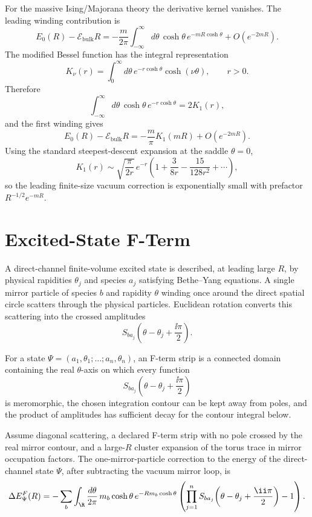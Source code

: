 \begin{example}
\label{ex:free-majorana-leading-winding}
For the massive Ising/Majorana theory the derivative kernel vanishes.  The
leading winding contribution is
\[
  E_0(R)-\mathcal E_{\mathrm{bulk}}R
  =
  -\frac{m}{2\pi}\int_{-\infty}^{\infty}d\theta\,
  \cosh\theta\,e^{-mR\cosh\theta}
  +O(e^{-2mR}).
\]
The modified Bessel function has the integral representation
\[
  K_\nu(r)=\int_0^\infty d\theta\,e^{-r\cosh\theta}\cosh(\nu\theta),
  \qquad r>0.
\]
Therefore
\[
  \int_{-\infty}^{\infty}d\theta\,
  \cosh\theta\,e^{-r\cosh\theta}=2K_1(r),
\]
and the first winding gives
\[
  E_0(R)-\mathcal E_{\mathrm{bulk}}R
  =
  -\frac{m}{\pi}K_1(mR)+O(e^{-2mR}).
\]
Using the standard steepest-descent expansion at the saddle \(\theta=0\),
\[
  K_1(r)
  \sim
  \sqrt{\frac{\pi}{2r}}\,e^{-r}
  \left(1+\frac{3}{8r}-\frac{15}{128r^2}+\cdots\right),
\]
so the leading finite-size vacuum correction is exponentially small with
prefactor \(R^{-1/2}e^{-mR}\).
\end{example}

\section{Excited-State F-Term}

A direct-channel finite-volume excited state is described, at leading large
\(R\), by physical rapidities \(\theta_j\) and species \(a_j\) satisfying
Bethe--Yang equations.  A single mirror particle of species \(b\) and rapidity
\(\theta\) winding once around the direct spatial circle scatters through the
physical particles.  Euclidean rotation converts this scattering into the
crossed amplitudes
\[
  S_{b a_j}\!\left(\theta-\theta_j+\frac{\ii\pi}{2}\right).
\]

\begin{definition}
\label{def:f-term-analytic-strip}
For a state \(\Psi=(a_1,\theta_1;\ldots;a_n,\theta_n)\), an F-term strip is a
connected domain containing the real \(\theta\)-axis on which every function
\[
  S_{b a_j}\!\left(\theta-\theta_j+\frac{\ii\pi}{2}\right)
\]
is meromorphic, the chosen integration contour can be kept away from poles,
and the product of amplitudes has sufficient decay for the contour integral
below.
\end{definition}

\begin{controlledapproximation}
\label{ca:one-winding-excited-state-f-term}
Assume diagonal scattering, a declared F-term strip with no pole crossed by
the real mirror contour, and a large-\(R\) cluster expansion of the torus trace
in mirror occupation factors.  The one-mirror-particle correction to the
energy of the direct-channel state \(\Psi\), after subtracting the vacuum
mirror loop, is
\[
  \Delta E_{\Psi}^{F}(R)
  =
  -\sum_b\int_{\R}\frac{d\theta}{2\pi}\,
  m_b\cosh\theta\,e^{-Rm_b\cosh\theta}
  \left(
  \prod_{j=1}^{n}
  S_{b a_j}\!\left(\theta-\theta_j+\frac{\ii\pi}{2}\right)
  -1
  \right).
\]
\end{controlledapproximation}

